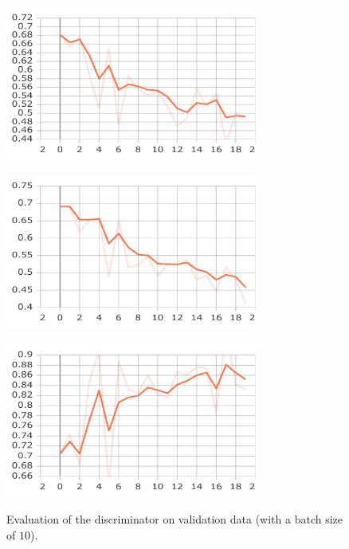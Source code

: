 \begin{figure}[htbp]
	\centering
	\begin{minipage}{0.8\textwidth}
		\centering
		\includegraphics[width=0.75\textwidth]{Sources/Results/no_pooling/plots_pdf/epoch_VALIDATION_D_fake_loss.pdf}
		\label{fig:2a}
	\end{minipage}%
	
	\begin{minipage}{0.8\textwidth}
		\centering
		\includegraphics[width=0.75\textwidth]{Sources/Results/no_pooling/plots_pdf/epoch_VALIDATION_D_real_loss.pdf}
		\label{fig:2b}
	\end{minipage}%

	\begin{minipage}{0.8\textwidth}
	\centering
	\includegraphics[width=0.75\textwidth]{Sources/Results/no_pooling/plots_pdf/epoch_VALIDATION_D_fake_acc.pdf}
	\label{fig:2c}
	\end{minipage}%
	
	\caption{Evaluation of the discriminator on validation data (with a batch size of $10$).} \label{fig:2}
\end{figure}

